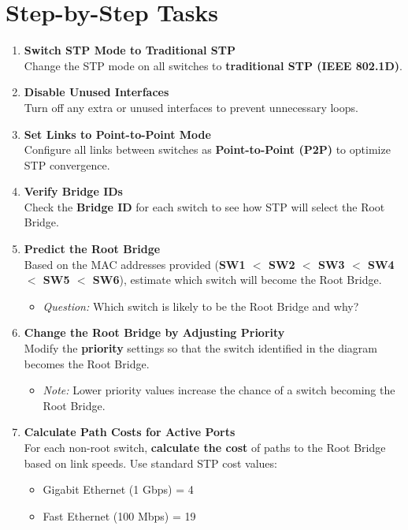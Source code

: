 \documentclass[a4paper]{book}
\begin{document}
\section*{Step-by-Step Tasks}

\begin{enumerate}
    \item \textbf{Switch STP Mode to Traditional STP} \\
    Change the STP mode on all switches to \textbf{traditional STP (IEEE 802.1D)}. 
    
    
    
    \item \textbf{Disable Unused Interfaces} \\
    Turn off any extra or unused interfaces to prevent unnecessary loops.

    
    \item \textbf{Set Links to Point-to-Point Mode} \\
    Configure all links between switches as \textbf{Point-to-Point (P2P)} to optimize STP convergence.

    
    \item \textbf{Verify Bridge IDs} \\
    Check the \textbf{Bridge ID} for each switch to see how STP will select the Root Bridge.

    
    \item \textbf{Predict the Root Bridge} \\
    Based on the MAC addresses provided (\textbf{SW1 $<$ SW2 $<$ SW3 $<$ SW4 $<$ SW5 $<$ SW6}), estimate which switch will become the Root Bridge.
    \begin{itemize}
        \item \textit{Question:} Which switch is likely to be the Root Bridge and why?
    \end{itemize}
    
    \item \textbf{Change the Root Bridge by Adjusting Priority} \\
    Modify the \textbf{priority} settings so that the switch identified in the diagram becomes the Root Bridge.
    \begin{itemize}
        
        \item \textit{Note:} Lower priority values increase the chance of a switch becoming the Root Bridge.
    \end{itemize}
    
    \item \textbf{Calculate Path Costs for Active Ports} \\
    For each non-root switch, \textbf{calculate the cost} of paths to the Root Bridge based on link speeds. Use standard STP cost values:
    \begin{itemize}
        \item Gigabit Ethernet (1 Gbps) = 4
        \item Fast Ethernet (100 Mbps) = 19
    \end{itemize}
    

\end{enumerate}
\end{document}
